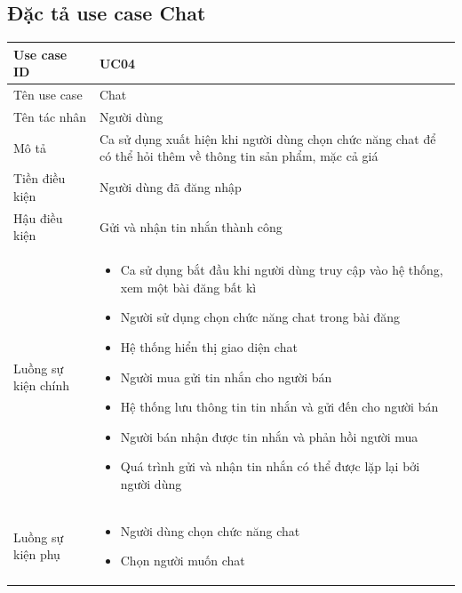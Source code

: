 \documentclass[../DoAn.tex]{subfiles}
\begin{document}
\subsection{Đặc tả use case Chat}
\hfill
\begin{table}[H]
\begin{tabular}{|p{3cm}|p{12cm}|}
\hline
Use case ID         & UC04                                                                                                               \\ \hline
Tên use case        & Chat                                                                                                   \\ \hline
Tên tác nhân        & Người dùng                                                                                                         \\ \hline
Mô tả               & Ca sử dụng xuất hiện khi người dùng chọn chức năng chat để có thể hỏi thêm về thông tin sản phẩm, mặc cả giá\\ \hline
Tiền điều kiện      & Người dùng đã đăng nhập                                                                                                              \\ \hline
Hậu điều kiện       & Gửi và nhận tin nhắn thành công                                                                                                              \\ \hline
Luồng sự kiện chính & 
\begin{itemize}
    \item Ca sử dụng bắt đầu khi người dùng truy cập vào hệ thống, xem một bài đăng bất kì
    \item Người sử dụng chọn chức năng chat trong bài đăng
    \item Hệ thống hiển thị giao diện chat
    \item Người mua gửi tin nhắn cho người bán
    \item Hệ thống lưu thông tin tin nhắn và gửi đến cho người bán
    \item Người bán nhận được tin nhắn và phản hồi người mua
    \item Quá trình gửi và nhận tin nhắn có thể được lặp lại bởi người dùng
\end{itemize} \\\hline
Luồng sự kiện phụ   &                                      \begin{itemize}
    \item Người dùng chọn chức năng chat
    \item Chọn người muốn chat

\end{itemize}
\end{tabular}
\end{table}
\end{document}
